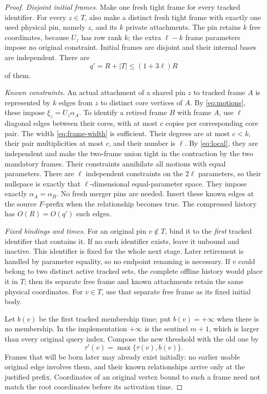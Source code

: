 \documentclass[11pt,a4paper]{article}
\theoremstyle{definition}
\theoremstyle{remark}
\begin{document}
\begin{proof}
\emph{Disjoint initial frames.}
Make one fresh tight frame for every tracked identifier.
For every $z\in T$, also make a distinct fresh tight
frame with exactly one used physical pin, namely $z$,
and its $k$ private attachments.
The pin retains $k$ free coordinates, because $U_z$
has row rank $k$; the extra $\ell-k$ frame parameters
impose no original constraint.
Initial frames are disjoint and their internal bases
are independent. There are
\begin{equation}\label{eq:child-count}
 q'=R+|T|\leq(1+3\ell)R
\end{equation}
of them.

\emph{Known constraints.}
An actual attachment of a shared pin $z$ to tracked
frame $A$ is represented by $k$ edges from $z$ to
distinct core vertices of $A$. By \eqref{eq:motions},
these impose $\xi_z=U_z\alpha_A$.
To identify a retired frame $B$ with frame $A$,
use $\ell$ diagonal edges between their cores,
with at most $c$ copies per corresponding core pair.
The width \eqref{eq:frame-width} is sufficient.
Their degrees are at most $c<k$, their pair
multiplicities at most $c$, and their number is $\ell$.
By \eqref{eq:local}, they are independent and make
the two-frame union tight in the contraction by the two mandatory
frames. Their constraints annihilate all motions with equal
parameters. There are $\ell$ independent constraints on the
$2\ell$ parameters, so their nullspace is exactly that
$\ell$-dimensional equal-parameter space. They impose exactly
$\alpha_A=\alpha_B$.
No fresh merger pins are needed.
Insert these known edges at the source $F$-prefix
when the relationship becomes true.
The compressed history has $O(R)=O(q')$ such edges.

\emph{Fixed bindings and times.}
For an original pin $v\notin T$, bind it to the
\emph{first} tracked identifier that contains it.
If no such identifier exists, leave it unbound and inactive.
This identifier is fixed for the whole next stage.
Later retirement is handled by parameter equality,
so no endpoint renaming is necessary.
If $v$ could belong to two distinct active tracked
sets, the complete offline history would place it
in $T$; then its separate free frame and known
attachments retain the same physical coordinates.
For $v\in T$, use that separate free frame as its
fixed initial body.

Let $b(v)$ be the first tracked membership time;
put $b(v)=+\infty$ when there is no membership.
In the implementation $+\infty$ is the sentinel $m+1$, which
is larger than every original query index.
Compose the new threshold with the old one by
\begin{equation}\label{eq:activation}
 \tau'(v)=\max\{\tau(v),b(v)\}.
\end{equation}
Frames that will be born later may already exist
initially: no earlier usable original edge involves
them, and their known relationships arrive only at
the justified prefix.
Coordinates of an original vertex bound to such a
frame need not match the root coordinates before
its activation time.


\end{proof}
\end{document}
